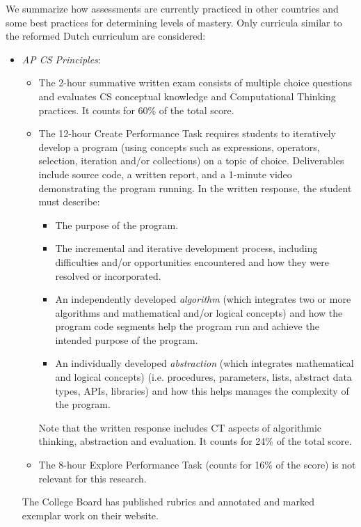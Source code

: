 We summarize how assessments are currently practiced in other countries and some best practices for determining levels of mastery. Only curricula similar to the reformed Dutch curriculum are considered:

\begin{itemize}
\item \emph{AP CS Principles}:

    \begin{itemize}
    \item The 2-hour summative written exam consists of multiple choice questions and evaluates CS conceptual knowledge and Computational Thinking practices. It counts for 60\% of the total score.
    \item The 12-hour Create Performance Task requires students to iteratively develop a program (using concepts such as expressions, operators, selection, iteration and/or collections) on a topic of choice. Deliverables include source code, a written report, and a 1-minute video demonstrating the program running. In the written response, the student must describe:
         \begin{itemize}
         \item The purpose of the program.
         \item The incremental and iterative development process, including difficulties and/or opportunities encountered and how they were resolved or incorporated.
         \item An independently developed \emph{algorithm} (which integrates two or more algorithms and mathematical and/or logical concepts) and how the program code segments help the program run and achieve the intended purpose of the program.
         \item An individually developed \emph{abstraction} (which integrates mathematical and logical concepts) (i.e. procedures, parameters, lists, abstract data types, APIs, libraries) and how this helps manages the complexity of the program.
         \end{itemize}
         Note that the written response includes CT aspects of algorithmic thinking, abstraction and evaluation. It counts for 24\% of the total score.
    \item The 8-hour Explore Performance Task (counts for 16\% of the score) is not relevant for this research.
    \end{itemize}
    The College Board has published rubrics and annotated and marked exemplar work on their website.


\end{itemize}
